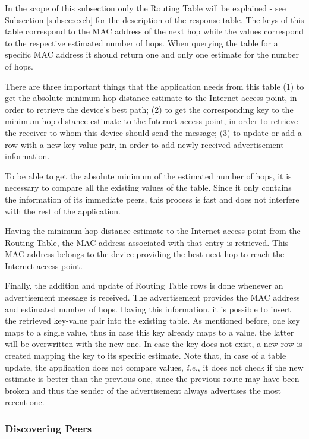 In the scope of this subsection only the Routing Table will be explained - see Subsection \ref{subsec:exch} for the description of the response table. The keys of this table correspond to the \gls{MAC} address of the next hop while the values correspond to the respective estimated number of hops. When querying the table for a specific \gls{MAC} address it should return one and only one estimate for the number of hops.

There are three important things that the application needs from this table (1) to get the absolute minimum hop distance estimate to the Internet access point, in order to retrieve the device's best path; (2) to get the corresponding key to the minimum hop distance estimate to the Internet access point, in order to retrieve the receiver to whom this device should send the message; (3) to update or add a row with a new key-value pair, in order to add newly received advertisement information.

To be able to get the absolute minimum of the estimated number of hops, it is necessary to compare all the existing values of the table. Since it only contains the information of its immediate peers, this process is fast and does not interfere with the rest of the application.

Having the minimum hop distance estimate to the Internet access point from the Routing Table, the \gls{MAC} address associated with that entry is retrieved. This \gls{MAC} address belongs to the device providing the best next hop to reach the Internet access point.

Finally, the addition and update of Routing Table rows is done whenever an advertisement message is received. The advertisement provides the \gls{MAC} address and estimated number of hops. Having this information, it is possible to insert the retrieved key-value pair into the existing table. As mentioned before, one key maps to a single value, thus in case this key already maps to a value, the latter will be overwritten with the new one. In case the key does not exist, a new row is created mapping the key to its specific estimate. Note that, in case of a table update, the application does not compare values, \textit{i.e.}, it does not check if the new estimate is better than the previous one, since the previous route may have been broken and thus the sender of the advertisement always advertises the most recent one.


\subsubsection{Discovering Peers}
\label{subsubsec:disc}

